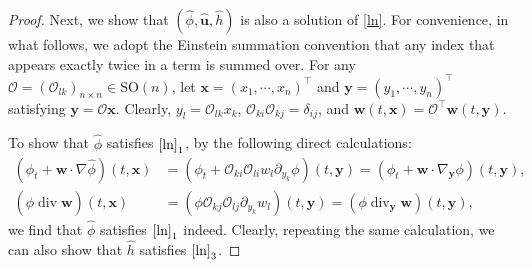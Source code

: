 \documentclass[11pt,reqno]{amsart}
\DeclareMathOperator{\diver}{\mathrm{div}}
\numberwithin{rk}{section}
\numberwithin{prop}{section}
\numberwithin{mydef}{section}
\numberwithin{lem}{section}
\numberwithin{equation}{section}
\numberwithin{thm}{section}
\begin{document}
\begin{proof}
Next, we show that $(\hat\phi,\hat{\boldsymbol{u}},\hat{h})$ is also a solution of \eqref{ln}. For convenience, in what follows, we adopt the Einstein summation convention that 
any index that appears exactly twice in a term is summed over.
For any $\mathcal{O}=(\mathcal{O}_{lk})_{n\times n}\in \mathrm{SO}(n)$, let $\boldsymbol{x}=(x_1,\cdots\!, x_n)^\top$ and $\boldsymbol{y}=(y_1,\cdots\!, y_n)^\top$ satisfying  $\boldsymbol{y}=\mathcal{O}\boldsymbol{x}$. Clearly, $y_l=\mathcal{O}_{lk}x_k$, $\mathcal{O}_{ki}\mathcal{O}_{kj}=\delta_{ij}$, and  $\boldsymbol{w}(t,\boldsymbol{x})=\mathcal{O}^\top \boldsymbol{w}(t,\boldsymbol{y})$. 

To show that $\hat\phi$ satisfies $\eqref{ln}_1$, by the following direct calculations: 
\begin{align*}
(\hat\phi_t+\boldsymbol{w}\cdot\nabla\hat\phi)(t,\boldsymbol{x})&=(\phi_t+\mathcal{O}_{ki}\mathcal{O}_{li}w_l\partial_{y_k}\phi) (t,\boldsymbol{y})=(\phi_t+\boldsymbol{w}\cdot\nabla_{\boldsymbol{y}}\phi)(t,\boldsymbol{y}),\\
(\hat\phi\diver\boldsymbol{w})(t,\boldsymbol{x})&=(\phi\mathcal{O}_{kj}\mathcal{O}_{lj} \partial_{y_k}w_l)(t,\boldsymbol{y})=(\phi\diver_{\boldsymbol{y}}\boldsymbol{w})(t,\boldsymbol{y}),
\end{align*}
we find that $\hat\phi$ satisfies  $\eqref{ln}_1$ indeed. Clearly, repeating the same calculation, we can also show that $\hat h$ satisfies $\eqref{ln}_3$.


\end{proof}
\end{document}
